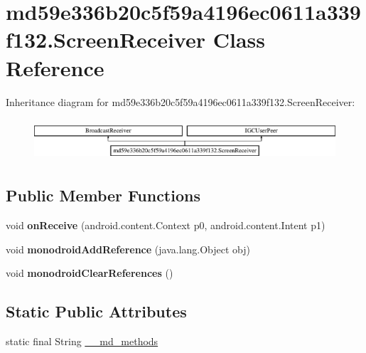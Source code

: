\hypertarget{classmd59e336b20c5f59a4196ec0611a339f132_1_1ScreenReceiver}{}\section{md59e336b20c5f59a4196ec0611a339f132.\+Screen\+Receiver Class Reference}
\label{classmd59e336b20c5f59a4196ec0611a339f132_1_1ScreenReceiver}
Inheritance diagram for md59e336b20c5f59a4196ec0611a339f132.\+Screen\+Receiver\+:\begin{figure}[H]
\begin{center}
\leavevmode
\includegraphics[height=1.568627cm]{classmd59e336b20c5f59a4196ec0611a339f132_1_1ScreenReceiver}
\end{center}
\end{figure}
\subsection*{Public Member Functions}
\begin{DoxyCompactItemize}
\item 
\mbox{\label{classmd59e336b20c5f59a4196ec0611a339f132_1_1ScreenReceiver_a22544797c6123859f8dcf7de2b8b76cc}} 
void {\bfseries on\+Receive} (android.\+content.\+Context p0, android.\+content.\+Intent p1)
\item 
\mbox{\label{classmd59e336b20c5f59a4196ec0611a339f132_1_1ScreenReceiver_ac160261a9b525c392ba2ddc0bbdae985}} 
void {\bfseries monodroid\+Add\+Reference} (java.\+lang.\+Object obj)
\item 
\mbox{\label{classmd59e336b20c5f59a4196ec0611a339f132_1_1ScreenReceiver_a4755050706a9b7bfa9c6a16ab606142e}} 
void {\bfseries monodroid\+Clear\+References} ()
\end{DoxyCompactItemize}
\subsection*{Static Public Attributes}
\begin{DoxyCompactItemize}
\item 
static final String \hyperlink{classmd59e336b20c5f59a4196ec0611a339f132_1_1ScreenReceiver_a85a11d9d021127da44fece55f1773028}{\+\_\+\+\_\+md\+\_\+methods}
\end{DoxyCompactItemize}

